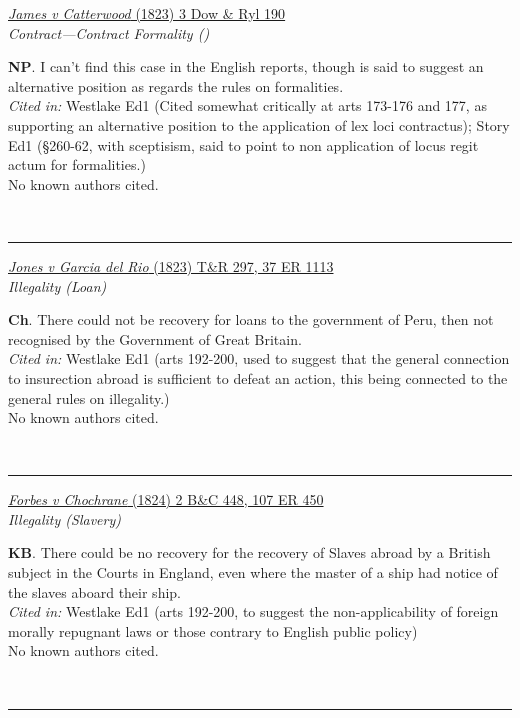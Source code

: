\documentclass[twoside]{article}
\begin{document}
        \begin{small}
        \begin{center}
        \href{None}{\textit{James v Catterwood} (1823) 3 Dow \& Ryl 190} \label{56} \\ 
\textit{Contract---Contract Formality ()}\\
        \end{center}
        \textbf{NP}. I can’t find this case in the English reports, though is said to suggest an alternative position as regards the rules on formalities.\\\textit{Cited in: }Westlake Ed1 (Cited somewhat critically at arts 173-176 and 177, as supporting an alternative position to the application of lex loci contractus); Story Ed1 (§260-62, with sceptisism, said to point to non application of locus regit actum for formalities.)\\No known authors cited.
        \end{small}\\
        \rule{\textwidth}{0.5pt}
        

        \begin{small}
        \begin{center}
        \href{https://heinonline.org/HOL/P?h=hein.engrep/engrc0037&i=1121}{\textit{Jones v Garcia del Rio} (1823) T\&R 297, 37 ER 1113} \label{71} \\ 
\textit{Illegality (Loan)}\\
        \end{center}
        \textbf{Ch}. There could not be recovery for loans to the government of Peru, then not recognised by the Government of Great Britain.\\\textit{Cited in: }Westlake Ed1 (arts 192-200, used to suggest that the general connection to insurection abroad is sufficient to defeat an action, this being connected to the general rules on illegality.)\\No known authors cited.
        \end{small}\\
        \rule{\textwidth}{0.5pt}
        

        \begin{small}
        \begin{center}
        \href{https://heinonline.org/HOL/P?h=hein.engrep/engrf0107&i=454}{\textit{Forbes v Chochrane} (1824) 2 B\&C 448, 107 ER 450} \label{75} \\ 
\textit{Illegality (Slavery)}\\
        \end{center}
        \textbf{KB}. There could be no recovery for the recovery of Slaves abroad by a British subject in the Courts in England, even where the master of a ship had notice of the slaves aboard their ship.\\\textit{Cited in: }Westlake Ed1 (arts 192-200, to suggest the non-applicability of foreign morally repugnant laws or those contrary to English public policy)\\No known authors cited.
        \end{small}\\
        \rule{\textwidth}{0.5pt}
        
\end{document}
